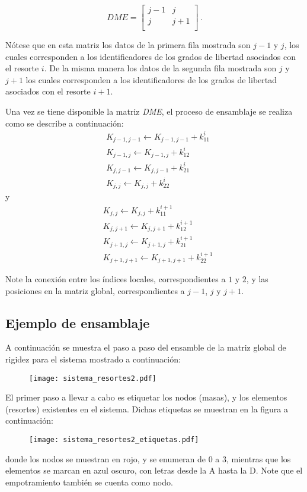 $$ DME = \begin{bmatrix}
j - 1 &j\\
j &j + 1\\
\end{bmatrix}\, .$$

Nótese que en esta matriz los datos de la primera fila mostrada son $j - 1$ y 
$j$, los cuales corresponden a los identificadores de los grados de libertad 
asociados con el resorte $i$. De la misma manera los datos de la segunda fila 
mostrada son $j$ y $j+1$ los cuales corresponden a los identificadores de los 
grados de libertad asociados con el resorte $i+1$.

Una vez se tiene disponible la matriz \emph{DME}, el proceso de ensamblaje se 
realiza como se describe a continuación:
\begin{align*}
&K_{j - 1,j - 1} \leftarrow K_{j - 1,j - 1} + k_{11}^i\\
&K_{j - 1,j} \leftarrow K_{j - 1,j} + k_{12}^i\\
&K_{j,j - 1} \leftarrow K_{j,j - 1} + k_{21}^i\\
&K_{j,j} \leftarrow K_{j,j} + k_{22}^i
\end{align*}
y
\begin{align*}
&K_{j,j} \leftarrow K_{j,j} + k_{11}^{i + 1}\\
&K_{j,j + 1} \leftarrow K_{j,j + 1} + k_{12}^{i + 1}\\
&K_{j + 1,j} \leftarrow K_{j + 1,j} + k_{21}^{i + 1}\\
&K_{j + 1,j + 1} \leftarrow K_{j + 1,j + 1} + k_{22}^{i + 1}
\end{align*}


Note la conexión entre los índices locales, correspondientes a $1$ y $2$, y las 
posiciones en la matriz global, correspondientes a $j-1$, $j$ y $j+1$.


\subsection{Ejemplo de ensamblaje}
A continuación se muestra el paso a paso del ensamble de la matriz global de 
rigidez para el sistema mostrado a continuación:
\begin{figure}[H]
    \centering
    \texttt{[image: sistema\_resortes2.pdf]}
\end{figure}

El primer paso a llevar a cabo es etiquetar los nodos (masas), y los elementos 
(resortes) existentes en el sistema. Dichas etiquetas se muestran en la figura 
a continuación:
\begin{figure}[H]
    \centering
    \texttt{[image: sistema\_resortes2\_etiquetas.pdf]}
\end{figure}
donde los nodos se muestran en rojo, y se enumeran de 0 a 3, mientras que los 
elementos se marcan en azul oscuro, con letras desde la A hasta la D. Note que 
el empotramiento también se cuenta como nodo.

